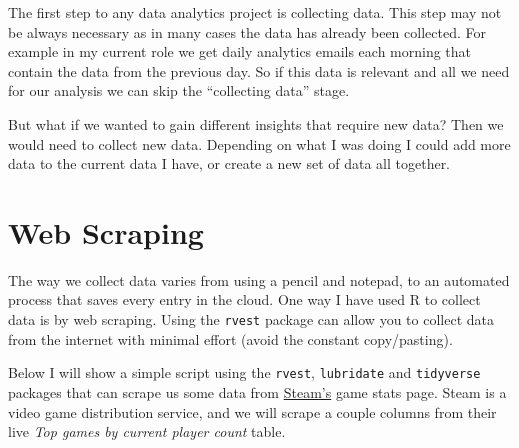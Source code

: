 \documentclass[
  letterpaper,
  DIV=11,
  numbers=noendperiod]{scrreprt}
\begin{document}
The first step to any data analytics project is collecting data. This
step may not be always necessary as in many cases the data has already
been collected. For example in my current role we get daily analytics
emails each morning that contain the data from the previous day. So if
this data is relevant and all we need for our analysis we can skip the
``collecting data'' stage.

But what if we wanted to gain different insights that require new data?
Then we would need to collect new data. Depending on what I was doing I
could add more data to the current data I have, or create a new set of
data all together.

\hypertarget{web-scraping}{%
\section{Web Scraping}\label{web-scraping}}

The way we collect data varies from using a pencil and notepad, to an
automated process that saves every entry in the cloud. One way I have
used R to collect data is by web scraping. Using the \texttt{rvest}
package can allow you to collect data from the internet with minimal
effort (avoid the constant copy/pasting).

Below I will show a simple script using the \texttt{rvest},
\texttt{lubridate} and \texttt{tidyverse} packages that can scrape us
some data from \href{https://store.steampowered.com/stats/}{Steam's}
game stats page. Steam is a video game distribution service, and we will
scrape a couple columns from their live \emph{Top games by current
player count} table.
\end{document}
